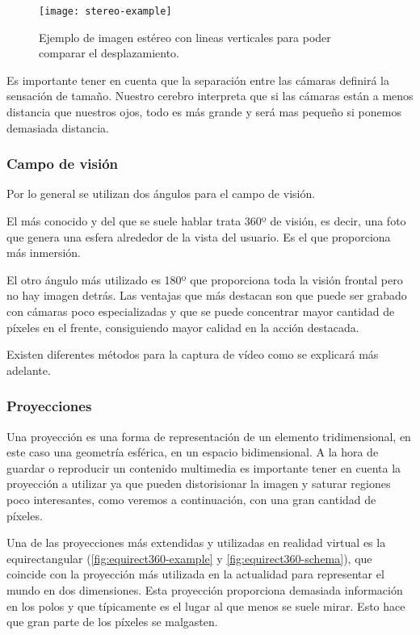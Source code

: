 \begin{figure}[h]
  \centering
  \texttt{[image: stereo-example]}
  \caption{Ejemplo de imagen estéreo con lineas verticales para poder comparar el desplazamiento.}
  \label{fig:stereo-example}
\end{figure}

Es importante tener en cuenta que la separación entre las cámaras definirá la sensación de tamaño. Nuestro cerebro interpreta que si las cámaras están a menos distancia que nuestros ojos, todo es más grande y será mas pequeño si ponemos demasiada distancia.


\subsubsection{Campo de visión}
Por lo general se utilizan dos ángulos para el campo de visión. 

El más conocido y del que se suele hablar trata 360º de visión, es decir, una foto que genera una esfera alrededor de la vista del usuario. Es el que proporciona más inmersión.

El otro ángulo más utilizado es 180º que proporciona toda la visión frontal pero no hay imagen detrás. Las ventajas que más destacan son que puede ser grabado con cámaras poco especializadas y que se puede concentrar mayor cantidad de píxeles en el frente, consiguiendo mayor calidad en la acción destacada.

Existen diferentes métodos para la captura de vídeo como se explicará más adelante.

\subsubsection{Proyecciones}
Una proyección es una forma de representación de un elemento tridimensional, en este caso una geometría esférica, en un espacio bidimensional. A la hora de guardar o reproducir un contenido multimedia es importante tener en cuenta la proyección a utilizar ya que pueden distorisionar la imagen y saturar regiones poco interesantes, como veremos a continuación, con una gran cantidad de píxeles. 

Una de las proyecciones más extendidas y utilizadas en realidad virtual es la equirectangular (\ref{fig:equirect360-example} y \ref{fig:equirect360-schema}), que coincide con la proyección más utilizada en la actualidad para representar el mundo en dos dimensiones. Esta proyección proporciona demasiada información en los polos y que típicamente es el lugar al que menos se suele mirar. Esto hace que gran parte de los píxeles se malgasten. 

